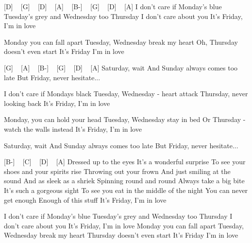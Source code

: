 [D] ~ [G] ~ [D] ~ [A] ~ [B-] ~ [G] ~ [D] ~ [A]
I don't care if Monday's blue
Tuesday's grey and Wednesday too
Thursday I don't care about you
It's Friday, I'm in love

Monday you can fall apart
Tuesday, Wednesday break my heart
Oh, Thursday doesn't even start
It's Friday I'm in love


[G] ~ [A] ~ [B-] ~ [G] ~ [D] ~ [A] 
Saturday, wait
And Sunday always comes too late
But Friday, never hesitate...

I don't care if Mondays black
Tuesday, Wednesday - heart attack
Thursday, never looking back
It's Friday, I'm in love

Monday, you can hold your head
Tuesday, Wednesday stay in bed
Or Thursday - watch the walls instead
It's Friday, I'm in love

Saturday, wait
And Sunday always comes too late
But Friday, never hesitate...

[B-] ~ [C] ~ [D] ~ [A]
Dressed up to the eyes
It's a wonderful surprise
To see your shoes and your spirits rise
Throwing out your frown
And just smiling at the sound
And as sleek as a shriek
Spinning round and round
Always take a big bite
It's such a gorgeous sight
To see you eat in the middle of the night
You can never get enough
Enough of this stuff
It's Friday, I'm in love

I don't care if Monday's blue
Tuesday's grey and Wednesday too
Thursday I don't care about you
It's Friday, I'm in love
Monday you can fall apart
Tuesday, Wednesday break my heart
Thursday doesn't even start
It's Friday I'm in love